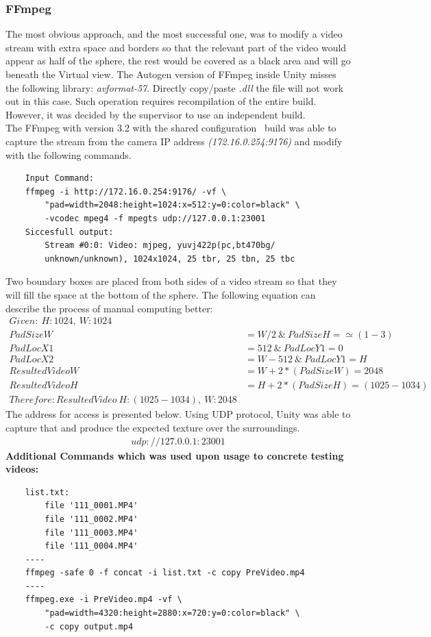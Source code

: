 \subsubsection{FFmpeg}
The most obvious approach, and the most successful one, was to modify a video stream with extra space and borders so that the relevant part of the video would appear as half of the sphere, the rest would be covered as a black area and will go beneath the Virtual view.
The Autogen version of FFmpeg inside Unity misses the following library: \textit{avformat-57}.
Directly copy/paste \textit{.dll} the file will not work out in this case.
Such operation requires recompilation of the entire build.
However, it was decided by the supervisor to use an independent build.\\
The FFmpeg with version 3.2 with the shared configuration~\cite{fate_ffmpeg_2018} build was able to capture the stream from the camera IP address \textit{(172.16.0.254:9176)} and modify with the following commands.
\begin{lstlisting}
    Input Command:
    ffmpeg -i http://172.16.0.254:9176/ -vf \
        "pad=width=2048:height=1024:x=512:y=0:color=black" \
        -vcodec mpeg4 -f mpegts udp://127.0.0.1:23001
    Siccesfull output:
        Stream #0:0: Video: mjpeg, yuvj422p(pc,bt470bg/
        unknown/unknown), 1024x1024, 25 tbr, 25 tbn, 25 tbc
\end{lstlisting}
Two boundary boxes are placed from both sides of a video stream so that they will fill the space at the bottom of the sphere. 
The following equation can describe the process of manual computing better:
\begin{align*}
    Given:\ H:1024,\ W:1024 \\
    PadSizeW&=W/2\ \&\ PadSizeH=\simeq (1-3) \\
    PadLocX1&=512 \ \&\ PadLocY1=0 \\
    PadLocX2&=W-512 \ \&\ PadLocY1=H \\
    ResultedVideoW&=W+2*(PadSizeW)=2048 \\
    ResultedVideoH&=H+2*(PadSizeH)=(1025-1034) \\
    Therefore: ResultedVideo\ H:(1025-1034),\ W:2048
\end{align*}
The address for access is presented below.
Using UDP protocol, Unity was able to capture that and produce the expected texture over the surroundings.
\begin{align*}
    udp://127.0.0.1:23001
\end{align*}
\textbf{Additional Commands which was used upon usage to concrete testing videos:}
\begin{lstlisting}
    list.txt:
        file '111_0001.MP4'
        file '111_0002.MP4'
        file '111_0003.MP4'
        file '111_0004.MP4'
    ----
    ffmpeg -safe 0 -f concat -i list.txt -c copy PreVideo.mp4
    ----
    ffmpeg.exe -i PreVideo.mp4 -vf \
        "pad=width=4320:height=2880:x=720:y=0:color=black" \
        -c copy output.mp4
\end{lstlisting}

